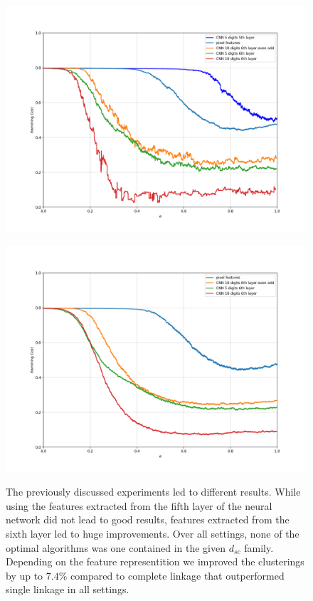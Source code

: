\begin{figure}[H]
\centering
\begin{minipage}{.45\textwidth}
  \centering
  {\includegraphics[width=\linewidth]{plots/mnist_overview}}
\end{minipage}\quad
\begin{minipage}{.45\textwidth}
  \centering
  {\includegraphics[width=\linewidth]{plots/mnist_overview_random}}
\end{minipage}
\caption{%
  The previously discussed experiments led to different results. While using the features extracted from the fifth layer of the neural network did not lead to good results, features extracted from the sixth layer led to huge improvements. Over all settings, none of the optimal algorithms was one contained in the given $d_{sc}$ family. Depending on the feature representition we improved the clusterings by up to $7.4\%$ compared to complete linkage that outperformed single linkage in all settings.}
\label{fig:mnist_overview}
\end{figure}





